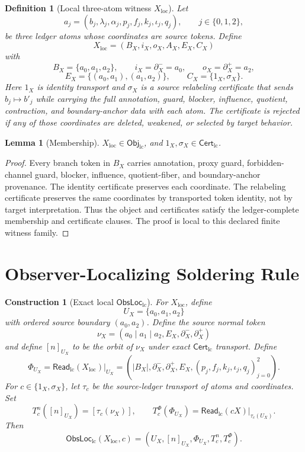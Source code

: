 \documentclass[11pt]{article}
\newcommand{\ObjLC}{\mathsf{Obj}_{\mathrm{lc}}}
\newcommand{\CertLC}{\mathsf{Cert}_{\mathrm{lc}}}
\newcommand{\ReadLC}{\mathsf{Read}_{\mathrm{lc}}}
\newcommand{\ObsLocLC}{\mathsf{ObsLoc}_{\mathrm{lc}}}
\newtheorem{definition}{Definition}
\newtheorem{construction}{Construction}
\newtheorem{lemma}{Lemma}
\begin{document}
\begin{definition}[Local three-atom witness \(X_{\mathrm{loc}}\)]
Let
\[
    a_j=(b_j,\lambda_j,\alpha_j,p_j,f_j,k_j,\iota_j,q_j),
    \qquad j\in\{0,1,2\},
\]
be three ledger atoms whose coordinates are source tokens. Define
\[
    X_{\mathrm{loc}}
    =
    (B_X,i_X,o_X,A_X,E_X,C_X)
\]
with
\[
    B_X=\{a_0,a_1,a_2\},\qquad i_X=\partial^-_X=a_0,
    \qquad o_X=\partial^+_X=a_2,
\]
\[
    E_X=\{(a_0,a_1),(a_1,a_2)\},
    \qquad C_X=\{1_X,\sigma_X\}.
\]
Here \(1_X\) is identity transport and \(\sigma_X\) is a source
relabeling certificate that sends \(b_j\mapsto b'_j\) while carrying
the full annotation, guard, blocker, influence, quotient, contraction,
and boundary-anchor data with each atom. The certificate is rejected
if any of those coordinates are deleted, weakened, or selected by
target behavior.
\end{definition}

\begin{lemma}[Membership]
\(X_{\mathrm{loc}}\in\ObjLC\), and \(1_X,\sigma_X\in\CertLC\).
\end{lemma}

\begin{proof}
Every branch token in \(B_X\) carries annotation, proxy guard,
forbidden-channel guard, blocker, influence, quotient-fiber, and
boundary-anchor provenance. The identity certificate preserves each
coordinate. The relabeling certificate preserves the same coordinates
by transported token identity, not by target interpretation. Thus the
object and certificates satisfy the ledger-complete membership and
certificate clauses. The proof is local to this declared finite
witness family.
\end{proof}

\section{Observer-Localizing Soldering Rule}

\begin{construction}[Exact local \(\ObsLocLC\)]
For \(X_{\mathrm{loc}}\), define
\[
    U_X=\{a_0,a_1,a_2\}
\]
with ordered source boundary \((a_0,a_2)\). Define the source normal
token
\[
    \nu_X=(a_0\mid a_1\mid a_2,E_X,\partial^-_X,\partial^+_X)
\]
and define \([n]_{U_X}\) to be the orbit of \(\nu_X\) under exact
\(\CertLC\) transport. Define
\[
    \Phi_{U_X}
    =
    \ReadLC(X_{\mathrm{loc}})|_{U_X}
    =
    (|B_X|,\partial^-_X,\partial^+_X,E_X,
    (p_j,f_j,k_j,\iota_j,q_j)_{j=0}^{2}).
\]
For \(c\in\{1_X,\sigma_X\}\), let \(\tau_c\) be the source-ledger
transport of atoms and coordinates. Set
\[
    T_c^n([n]_{U_X})=[\tau_c(\nu_X)],
    \qquad
    T_c^\Phi(\Phi_{U_X})=\ReadLC(cX)|_{\tau_c(U_X)}.
\]
Then
\[
    \ObsLocLC(X_{\mathrm{loc}},c)
    =
    (U_X,[n]_{U_X},\Phi_{U_X},T_c^n,T_c^\Phi).
\]
\end{construction}
\end{document}

